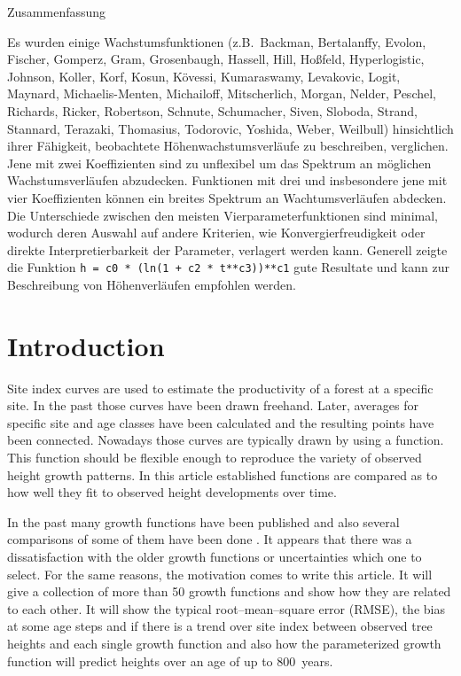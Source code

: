 \documentclass[a4paper,twocolumn]{article}
\begin{document}
\begin{center}
  Zusammenfassung
\end{center}
Es wurden einige Wachstumsfunktionen (z.B.\ Backman, Bertalanffy,
Evolon, Fischer, Gomperz, Gram, Grosenbaugh, Hassell, Hill,
Ho{\ss}feld, Hyperlogistic, Johnson, Koller, Korf, Kosun, K\"ovessi,
Kumaraswamy, Levakovic, Logit, Maynard, Michaelis-Menten, Michailoff,
Mitscherlich, Morgan, Nelder, Peschel, Richards, Ricker, Robertson,
Schnute, Schumacher, Siven, Sloboda, Strand, Stannard, Terazaki,
Thomasius, Todorovic, Yoshida, Weber, Weilbull) hinsichtlich ihrer
F\"ahigkeit, beobachtete H\"ohenwachstumsverl\"aufe zu beschreiben,
verglichen. Jene mit zwei Koeffizienten sind zu unflexibel um das
Spektrum an m\"oglichen Wachstumsverl\"aufen abzudecken. Funktionen mit
drei und insbesondere jene mit vier Koeffizienten k\"onnen ein breites
Spektrum an Wachtumsverl\"aufen abdecken. Die Unterschiede zwischen den
meisten Vierparameterfunktionen sind minimal, wodurch deren Auswahl
auf andere Kriterien, wie Konvergierfreudigkeit oder direkte
Interpretierbarkeit der Parameter, verlagert werden kann. Generell
zeigte die Funktion \texttt{h = c0 * (ln(1 + c2 * t**c3))**c1} gute
Resultate und kann zur Beschreibung von H\"ohenverl\"aufen empfohlen
werden.


\section{Introduction}

Site index curves are used to estimate the productivity of a forest at
a specific site. In the past those curves have been drawn
freehand. Later, averages for specific site and age classes have been
calculated and the resulting points have been connected. Nowadays
those curves are typically drawn by using a function. This function
should be flexible enough to reproduce the variety of observed height
growth patterns. In this article established functions are compared
as to how well they fit to observed height developments over time.

In the past many growth functions have been published and also several
comparisons of some of them have been done
\citep{Levakovic1935Bestandeshoehenkurve,peschel1938Wachstumsgesetze,todorovic1961GesetzmaessigkeitenDesWachstums,zeide1993AnalysisOfGrowthEquations,ricker1979GrowthRatesAndModels,elfving1997ConstructionOfSiteIndexEquations,zhang1997GrowthFunctions,chrobok2004DescriptiveGrowthModelOfTheHeightOfStapesInTheFetus,palahi2004SiteIndex,Khamis2005NonlinerGrowthModels,upadhyay2005SiteIndexEquations,koyo2013GeneralizedMathematicalModelForBiologicalGrowths,kutelka2015KORFitAnEfficientGrowthFunctionFittingTool,sedmak2015SigmoidGrowthFunction}.
It appears that there was a dissatisfaction with the older growth
functions or uncertainties which one to select. For the same reasons,
the motivation comes to write this article. It will give a collection
of more than 50 growth functions and show how they are related to each
other. It will show the typical root--mean--square error (RMSE), the
bias at some
age steps and if there is a trend over site index between observed
tree heights and each single growth function and also how the
parameterized growth function will predict heights over an age of
up to 800~years.
\end{document}
